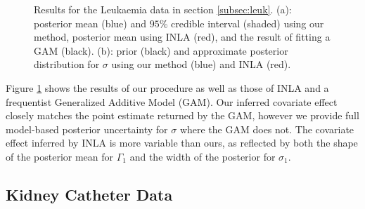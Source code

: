 \documentclass[serif,10pt]{wiley-article}
\begin{document}
\begin{figure}[ht]
\centering
{}
\caption{Results for the Leukaemia data in section \ref{subsec:leuk}. (a): posterior mean (blue) and $95\%$ credible interval (shaded) using our method, posterior mean using INLA (red), and the result of fitting a GAM (black). (b): prior (black) and approximate posterior distribution for $\sigma$ using our method (blue) and INLA (red).}
\label{fig:leuk}
\end{figure}

Figure \ref{fig:leuk} shows the results of our procedure as well as those of INLA and a frequentist Generalized Additive Model (GAM). Our inferred covariate effect closely matches the point estimate returned by the GAM, however we provide full model-based posterior uncertainty for $\sigma$ where the GAM does not. The covariate effect inferred by INLA is more variable than ours, as reflected by both the shape of the posterior mean for $\Gamma_{1}$ and the width of the posterior for $\sigma_{1}$.

\subsection{Kidney Catheter Data}\label{subsec:kidney}
\end{document}
